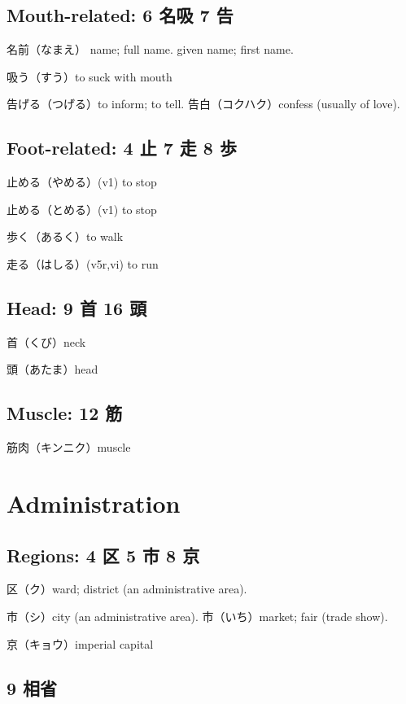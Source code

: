 \subsection{Mouth-related: 6 名吸 7 告}

名前（なまえ）
name; full name.
given name; first name.

吸う（すう）to suck with mouth

告げる（つげる）to inform; to tell.
告白（コクハク）confess (usually of love).

\subsection{Foot-related: 4 止 7 走 8 歩}

止める（やめる）(v1) to stop

止める（とめる）(v1) to stop

歩く（あるく）to walk

走る（はしる）(v5r,vi) to run

\subsection{Head: 9 首 16 頭}

首（くび）neck

頭（あたま）head

\subsection{Muscle: 12 筋}

筋肉（キンニク）muscle

\section{Administration}

\subsection{Regions: 4 区 5 市 8 京}

区（ク）ward; district (an administrative area).

市（シ）city (an administrative area).
市（いち）market; fair (trade show).

京（キョウ）imperial capital

\subsection{9 相省}

